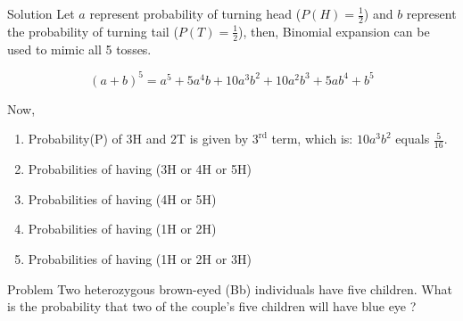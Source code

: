 \documentclass[11pt,ignorenonframetext,aspectratio=169]{beamer}
\providecommand{\tightlist}{%
  \setlength{\itemsep}{0pt}\setlength{\parskip}{0pt}}
\begin{document}
\begin{frame}{Solution}
\protect\hypertarget{solution}{}
Let \(a\) represent probability of turning head (\(P(H) = \frac{1}{2}\))
and \(b\) represent the probability of turning tail
(\(P(T) = \frac{1}{2}\)), then, Binomial expansion can be used to mimic
all 5 tosses.

\[
(a + b)^5 = a^5 + 5a^4b + 10 a^3 b^2 + 10 a^2 b^3 + 5 ab^4 + b^5
\]

Now,

\begin{enumerate}
\tightlist
\item
  Probability(P) of 3H and 2T is given by \(\mathrm{3^{rd}}\) term,
  which is: \(10 a^3 b^2\) equals \(\frac{5}{16}\).
\item
  Probabilities of having (3H or 4H or 5H)
\item
  Probabilities of having (4H or 5H)
\item
  Probabilities of having (1H or 2H)
\item
  Probabilities of having (1H or 2H or 3H)
\end{enumerate}
\end{frame}

\begin{frame}{Problem}
\protect\hypertarget{problem-1}{}
Two heterozygous brown-eyed (Bb) individuals have five children. What is
the probability that two of the couple's five children will have blue
eye ?
\end{frame}
\end{document}
